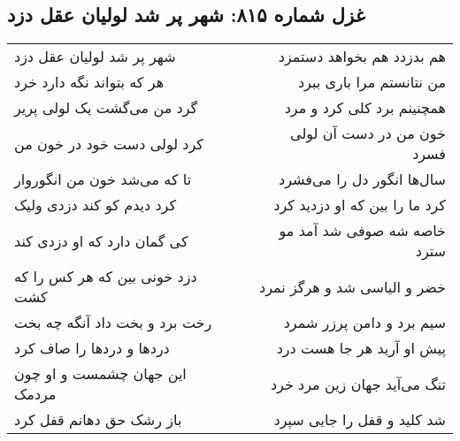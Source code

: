 \begin{center}
\section*{غزل شماره ۸۱۵: شهر پر شد لولیان عقل دزد}
\label{sec:0815}
\begin{longtable}{l p{0.5cm} r}
شهر پر شد لولیان عقل دزد
&&
هم بدزدد هم بخواهد دستمزد
\\
هر که بتواند نگه دارد خرد
&&
من نتانستم مرا باری ببرد
\\
گرد من می‌گشت یک لولی پریر
&&
همچنینم برد کلی کرد و مرد
\\
کرد لولی دست خود در خون من
&&
خون من در دست آن لولی فسرد
\\
تا که می‌شد خون من انگوروار
&&
سال‌ها انگور دل را می‌فشرد
\\
کرد دیدم کو کند دزدی ولیک
&&
کرد ما را بین که او دزدید کرد
\\
کی گمان دارد که او دزدی کند
&&
خاصه شه صوفی شد آمد مو سترد
\\
دزد خونی بین که هر کس را که کشت
&&
خضر و الیاسی شد و هرگز نمرد
\\
رخت برد و بخت داد آنگه چه بخت
&&
سیم برد و دامن پرزر شمرد
\\
دردها و دردها را صاف کرد
&&
پیش او آرید هر جا هست درد
\\
این جهان چشمست و او چون مردمک
&&
تنگ می‌آید جهان زین مرد خرد
\\
باز رشک حق دهانم قفل کرد
&&
شد کلید و قفل را جایی سپرد
\\
\end{longtable}
\end{center}
